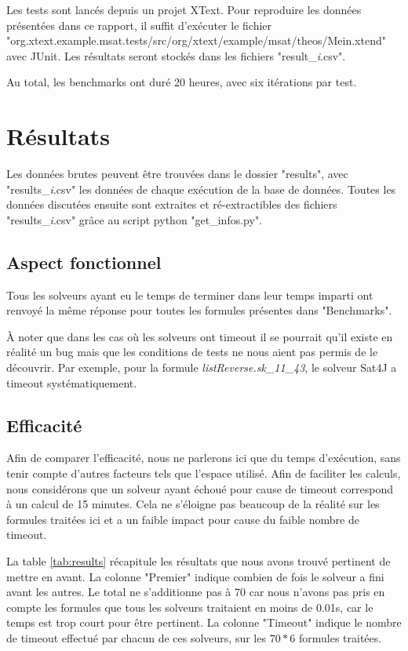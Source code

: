 \documentclass[11pt,a4paper]{article}
\begin{document}
Les tests sont lancés depuis un projet XText. Pour reproduire les données présentées dans ce rapport, il suffit d'exécuter le fichier "org.xtext.example.msat.tests/src/org/xtext/example/msat/theos/Mein.xtend" avec JUnit. Les résultats seront stockés dans les fichiers "result\_\textit{i}.csv".

Au total, les benchmarks ont duré 20 heures, avec six itérations par test.


\section{Résultats}

Les données brutes peuvent être trouvées dans le dossier "results", avec "results\_\textit{i}.csv" les données de chaque exécution de la base de données.
Toutes les données discutées ensuite sont extraites et ré-extractibles des fichiers "results\_\textit{i}.csv" grâce au script python "get\_infos.py". 

\subsection{Aspect fonctionnel}

Tous les solveurs ayant eu le temps de terminer dans leur temps imparti ont renvoyé la même réponse pour toutes les formules présentes dans "Benchmarks".

À noter que dans les cas où les solveurs ont timeout il se pourrait qu'il existe en réalité un bug mais que les conditions de tests ne nous aient pas permis de le découvrir. Par exemple, pour la formule \textit{listReverse.sk\_11\_43}, le solveur Sat4J a timeout systématiquement.

\subsection{Efficacité}

Afin de comparer l'efficacité, nous ne parlerons ici que du temps d'exécution, sans tenir compte d'autres facteurs tels que l'espace utilisé. Afin de faciliter les calculs, nous considérons que un solveur ayant échoué pour cause de timeout correspond à un calcul de 15 minutes. Cela ne s'éloigne pas beaucoup de la réalité sur les formules traitées ici et a un faible impact pour cause du faible nombre de timeout.

La table \ref{tab:results} récapitule les résultats que nous avons trouvé pertinent de mettre en avant. 
La colonne "Premier" indique combien de fois le solveur a fini avant les autres. Le total ne s'additionne pas à 70 car nous n'avons pas pris en compte les formules que tous les solveurs traitaient en moins de 0.01s, car le temps est trop court pour être pertinent.
La colonne "Timeout" indique le nombre de timeout effectué par chacun de ces solveurs, sur les $70 * 6$ formules traitées. 
\end{document}
